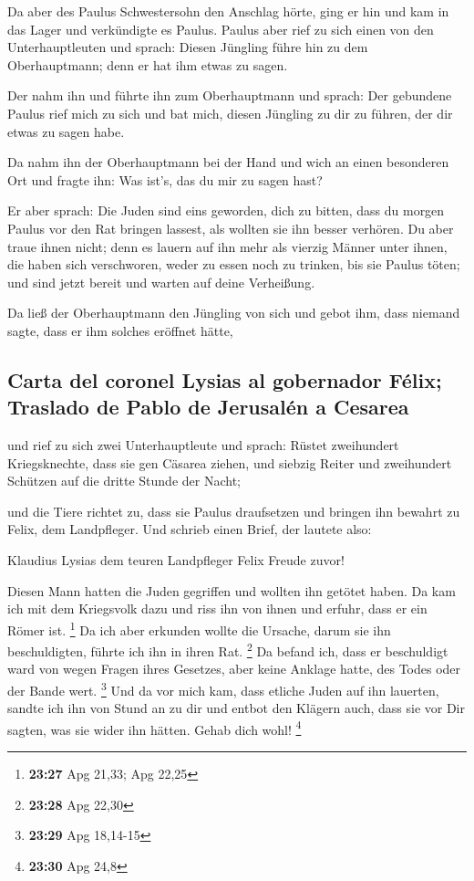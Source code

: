  Da aber des Paulus Schwestersohn den Anschlag hörte,
ging er hin und kam in das Lager und verkündigte es Paulus.
 Paulus aber rief zu sich einen von den Unterhauptleuten
und sprach: Diesen Jüngling führe hin zu dem Oberhauptmann; denn er hat
ihm etwas zu sagen.

 Der nahm ihn und führte ihn zum Oberhauptmann und
sprach: Der gebundene Paulus rief mich zu sich und bat mich, diesen
Jüngling zu dir zu führen, der dir etwas zu sagen habe.

 Da nahm ihn der Oberhauptmann bei der Hand und wich an
einen besonderen Ort und fragte ihn: Was ist's, das du mir zu sagen
hast?

 Er aber sprach: Die Juden sind eins geworden, dich zu
bitten, dass du morgen Paulus vor den Rat bringen lassest, als wollten
sie ihn besser verhören.  Du aber traue ihnen nicht; denn
es lauern auf ihn mehr als vierzig Männer unter ihnen, die haben sich
verschworen, weder zu essen noch zu trinken, bis sie Paulus töten; und
sind jetzt bereit und warten auf deine Verheißung.

 Da ließ der Oberhauptmann den Jüngling von sich und
gebot ihm, dass niemand sagte, dass er ihm solches eröffnet hätte,

\hypertarget{carta-del-coronel-lysias-al-gobernador-fuxe9lix-traslado-de-pablo-de-jerusaluxe9n-a-cesarea}{%
\subsection{Carta del coronel Lysias al gobernador Félix; Traslado de
Pablo de Jerusalén a
Cesarea}\label{carta-del-coronel-lysias-al-gobernador-fuxe9lix-traslado-de-pablo-de-jerusaluxe9n-a-cesarea}}

 und rief zu sich zwei Unterhauptleute und sprach: Rüstet
zweihundert Kriegsknechte, dass sie gen Cäsarea ziehen, und siebzig
Reiter und zweihundert Schützen auf die dritte Stunde der Nacht;

 und die Tiere richtet zu, dass sie Paulus draufsetzen
und bringen ihn bewahrt zu Felix, dem Landpfleger.  Und
schrieb einen Brief, der lautete also:

 Klaudius Lysias dem teuren Landpfleger Felix Freude
zuvor!

 Diesen Mann hatten die Juden gegriffen und wollten ihn
getötet haben. Da kam ich mit dem Kriegsvolk dazu und riss ihn von ihnen
und erfuhr, dass er ein Römer ist. \footnote{\textbf{23:27} Apg 21,33;
  Apg 22,25}  Da ich aber erkunden wollte die Ursache,
darum sie ihn beschuldigten, führte ich ihn in ihren Rat. \footnote{\textbf{23:28}
  Apg 22,30}  Da befand ich, dass er beschuldigt ward von
wegen Fragen ihres Gesetzes, aber keine Anklage hatte, des Todes oder
der Bande wert. \footnote{\textbf{23:29} Apg 18,14-15} 
Und da vor mich kam, dass etliche Juden auf ihn lauerten, sandte ich ihn
von Stund an zu dir und entbot den Klägern auch, dass sie vor Dir
sagten, was sie wider ihn hätten. Gehab dich wohl! \footnote{\textbf{23:30}
  Apg 24,8}

